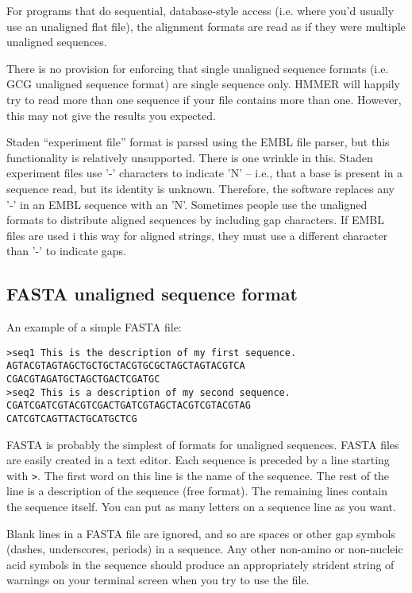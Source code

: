 For programs that do sequential, database-style access (i.e.  where
you'd usually use an unaligned flat file), the alignment formats are
read as if they were multiple unaligned sequences.

There is no provision for enforcing that single unaligned sequence
formats (i.e. GCG unaligned sequence format) are single sequence
only. HMMER will happily try to read more than one sequence if your
file contains more than one. However, this may not give the results
you expected.

Staden ``experiment file'' format is parsed using the EMBL file
parser, but this functionality is relatively unsupported. There is one
wrinkle in this. Staden experiment files use '-' characters to
indicate 'N' -- i.e., that a base is present in a sequence read, but
its identity is unknown. Therefore, the software replaces any '-' in
an EMBL sequence with an 'N'. Sometimes people use the unaligned
formats to distribute aligned sequences by including gap
characters. If EMBL files are used i this way for aligned strings,
they must use a different character than '-' to indicate gaps.

\subsection{FASTA unaligned sequence format}

An example of a simple FASTA file: 

\begin{verbatim}
>seq1 This is the description of my first sequence.
AGTACGTAGTAGCTGCTGCTACGTGCGCTAGCTAGTACGTCA
CGACGTAGATGCTAGCTGACTCGATGC
>seq2 This is a description of my second sequence.
CGATCGATCGTACGTCGACTGATCGTAGCTACGTCGTACGTAG
CATCGTCAGTTACTGCATGCTCG
\end{verbatim}

FASTA is probably the simplest of formats for unaligned sequences.
FASTA files are easily created in a text editor.  Each sequence is
preceded by a line starting with \verb+>+. The first word on this line
is the name of the sequence. The rest of the line is a description of
the sequence (free format). The remaining lines contain the sequence
itself. You can put as many letters on a sequence line as you want.

Blank lines in a FASTA file are ignored, and so are spaces or other
gap symbols (dashes, underscores, periods) in a sequence. Any other
non-amino or non-nucleic acid symbols in the sequence should produce
an appropriately strident string of warnings on your terminal screen
when you try to use the file.


